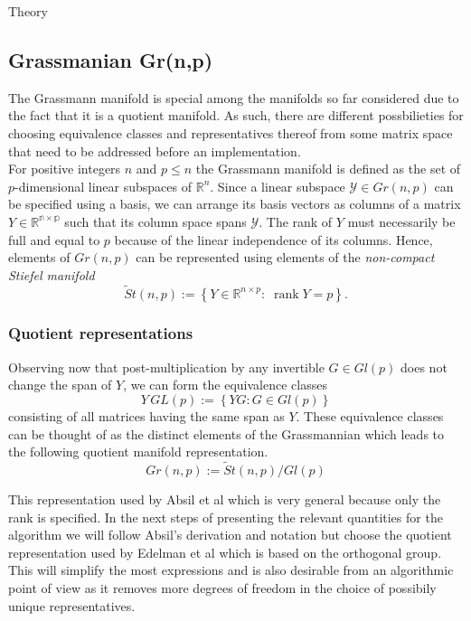 \begin{chapter}{Theory}
\subsection{Grassmanian Gr(n,p)} %
\label{sub:Grassmanian}
The Grassmann manifold is special among the manifolds so far considered due to the fact that it is a quotient manifold. 
As such, there are different possbilieties for choosing equivalence classes and representatives thereof from some matrix space that need to be addressed
before an implementation.\\

For positive integers $n$ and $p\leq n$ the Grassmann manifold is defined as the set of $p$-dimensional linear subspaces of $\mathbb{R}^n$. 
Since a linear subspace $\mathcal{Y}\in Gr(n,p)$ can be specified using a basis, we can arrange its basis vectors as columns of
a matrix $Y\in\mathbb{R^{n\times p}}$ such that its column space spans $\mathcal{Y}$. The rank of $Y$ must necessarily be full and equal to $p$ because of the linear independence
of its columns. Hence, elements of $Gr(n,p)$ can be represented using elements of the \emph{non-compact Stiefel manifold}
\begin{equation}
    \tilde St(n,p) := \left\lbrace Y\in\mathbb{R}^{n\times p}:\; \operatorname{rank}Y=p\right\rbrace.
\end{equation}

\subsubsection{Quotient representations} %
\label{ssub:Quotient representations}
Observing now that post-multiplication by any invertible $G\in Gl(p)$ does not change the span of $Y$, we can form the equivalence classes
\begin{equation}
    Y\,GL(p) := \left\lbrace YG: G\in Gl(p)\right\rbrace
\end{equation}
consisting of all matrices having the same span as $Y$. These equivalence classes can be thought of as the distinct elements of the Grassmannian which
leads to the following quotient manifold representation.\\
\begin{equation}
    Gr(n,p):=\tilde St(n,p) / Gl(p)
\end{equation}

This representation used by Absil et al\cite{AbsilGrassmann} which is very general because only the rank is specified. In the next steps of presenting the relevant quantities for the
algorithm we will follow Absil's derivation and notation but choose the quotient representation used by Edelman et al \cite{EAS} which is based on the orthogonal group. This will simplify the
most expressions and is also desirable from an algorithmic point of view as it removes more degrees of freedom in the choice of possibily unique representatives.\\


\end{chapter}
